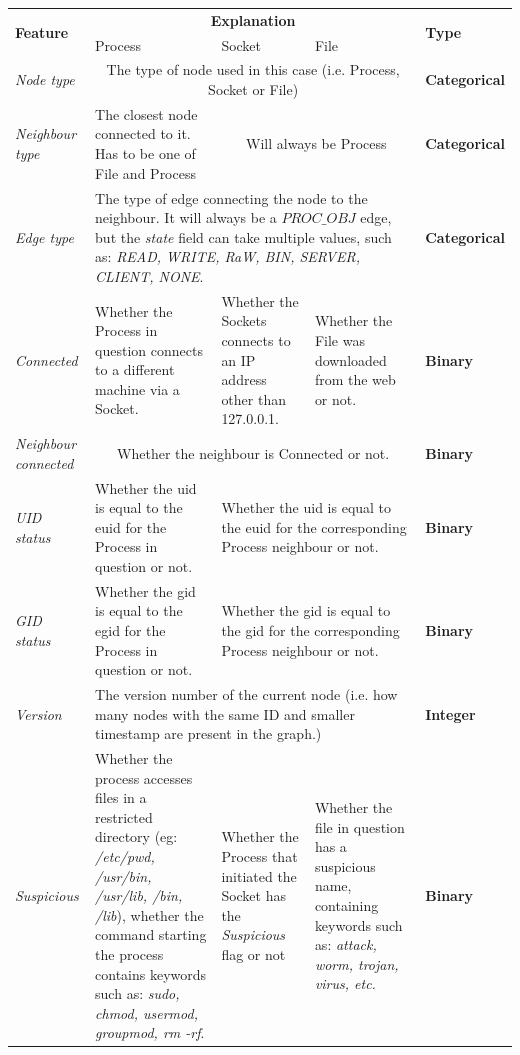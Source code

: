 	\begin{longtable}{| p{} || p{} | p{} | p{} | p{} |}

		\hline
		\multirow{2}{3cm}{\textbf{Feature}} & \multicolumn{3}{c|}{\textbf{Explanation}} & \multirow{2}{2cm}{\textbf{Type}}\\
		& Process & Socket & File &\\
		\hline
		\textit{Node type} & \multicolumn{3}{c|}{The type of node used in this case (i.e. Process, Socket or File)} & \textbf{Categorical} \\
		\hline
		\textit{Neighbour type} & The closest node connected to it. Has to be one of File and Process & 
		\multicolumn{2}{c|}{Will always be Process} & \textbf{Categorical}\\
		\hline
		\textit{Edge type} & \multicolumn{3}{p{.75\textwidth}|}{The type of edge connecting the node to the neighbour. It will always be a $PROC\_OBJ$ edge, but the \textit{state} field can take multiple values, such as:  \textit{READ, WRITE, RaW, BIN, SERVER, CLIENT, NONE}.} & \textbf{Categorical}\\
		\hline
		\textit{Connected} & Whether the Process in question connects to a different machine via a Socket. & Whether the Sockets connects to an IP address other than 127.0.0.1. & Whether the File was downloaded from the web or not. & \textbf{Binary} \\
		\hline
		\textit{Neighbour connected} & \multicolumn{3}{c|}{Whether the neighbour is Connected or not.} & \textbf{Binary} \\ 
		\hline
		\textit{UID status} & Whether the uid is equal to the euid for the Process in question or not. & \multicolumn{2}{p{.50\textwidth}|}{Whether the uid is equal to the euid for the corresponding Process neighbour or not.} & \textbf{Binary} \\
		\hline
		\textit{GID status } & Whether the gid is equal to the egid for the Process in question or not. & \multicolumn{2}{p{.50\textwidth}|}{Whether the gid is equal to the gid for the corresponding Process neighbour or not.} & \textbf{Binary} \\
		\hline
		\textit{Version} & \multicolumn{3}{p{.75\textwidth}|}{The version number of the current node (i.e. how many nodes with the same ID and smaller timestamp are present in the graph.)} & \textbf{Integer} \\
		\hline
		\textit{Suspicious} & Whether the process accesses files in a restricted directory (eg: \textit{/etc/pwd, /usr/bin, /usr/lib, /bin, /lib}), whether the command starting the process contains keywords such as: \textit{sudo, chmod, usermod, groupmod, rm -rf}. & Whether the Process that initiated the Socket has the \textit{Suspicious} flag or not &Whether the file in question has a suspicious name, containing keywords such as: \textit{attack, worm, trojan, virus, etc.} & \textbf{Binary} \\

\end{longtable}

